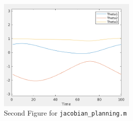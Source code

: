 \documentclass[letterpaper]{article}
\begin{document}
\begin{figure}[h]
  \centering
  \includegraphics[width=0.6\textwidth]{figs/jaco-2.png}
  \caption{Second Figure for \texttt{jacobian\_planning.m}}
\end{figure}
\end{document}
